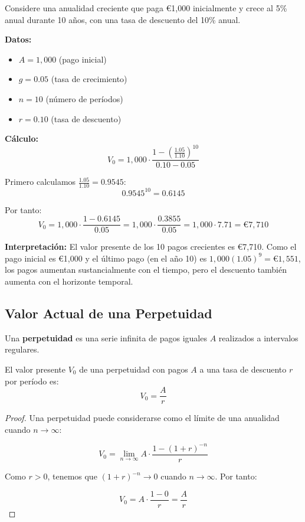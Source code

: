 \begin{ejemplo}
Considere una anualidad creciente que paga €1,000 inicialmente y crece al 5\% anual durante 10 años, con una tasa de descuento del 10\% anual.

\textbf{Datos:}
\begin{itemize}
\item $A = 1{,}000$ (pago inicial)
\item $g = 0.05$ (tasa de crecimiento)
\item $n = 10$ (número de períodos)
\item $r = 0.10$ (tasa de descuento)
\end{itemize}

\textbf{Cálculo:}
$$V_0 = 1{,}000 \cdot \frac{1 - \left(\frac{1.05}{1.10}\right)^{10}}{0.10 - 0.05}$$

Primero calculamos $\frac{1.05}{1.10} = 0.9545$:
$$0.9545^{10} = 0.6145$$

Por tanto:
$$V_0 = 1{,}000 \cdot \frac{1 - 0.6145}{0.05} = 1{,}000 \cdot \frac{0.3855}{0.05} = 1{,}000 \cdot 7.71 = \text{€}7{,}710$$

\textbf{Interpretación:} El valor presente de los 10 pagos crecientes es €7,710. Como el pago inicial es €1,000 y el último pago (en el año 10) es $1{,}000(1.05)^9 = \text{€}1{,}551$, los pagos aumentan sustancialmente con el tiempo, pero el descuento también aumenta con el horizonte temporal.
\end{ejemplo}

\subsection{Valor Actual de una Perpetuidad}

\begin{definicion}[Perpetuidad]
Una \textbf{perpetuidad} es una serie infinita de pagos iguales $A$ realizados a intervalos regulares.
\end{definicion}

\begin{teorema}
El valor presente $V_0$ de una perpetuidad con pagos $A$ a una tasa de descuento $r$ por período es:
\begin{equation}
V_0 = \frac{A}{r}
\end{equation}
\end{teorema}

\begin{proof}
Una perpetuidad puede considerarse como el límite de una anualidad cuando $n \to \infty$:

$$V_0 = \lim_{n \to \infty} A \cdot \frac{1 - (1 + r)^{-n}}{r}$$

Como $r > 0$, tenemos que $(1 + r)^{-n} \to 0$ cuando $n \to \infty$. Por tanto:

$$V_0 = A \cdot \frac{1 - 0}{r} = \frac{A}{r}$$
\end{proof}

